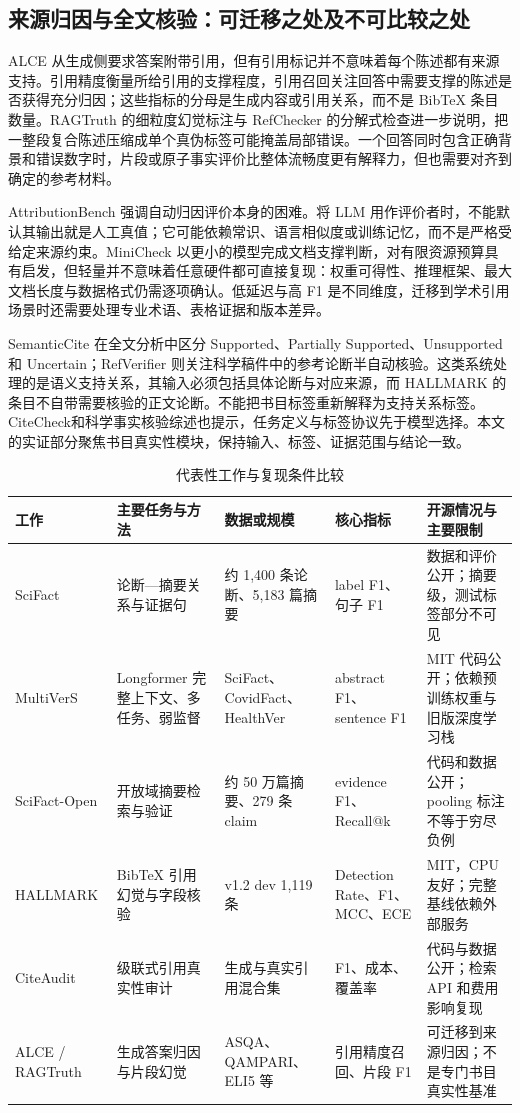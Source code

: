 \documentclass[UTF8,a4paper,11pt]{ctexart}
\begin{document}
\subsection{来源归因与全文核验：可迁移之处及不可比较之处}

ALCE 从生成侧要求答案附带引用\cite{alce}，但有引用标记并不意味着每个陈述都有来源支持。引用精度衡量所给引用的支撑程度，引用召回关注回答中需要支撑的陈述是否获得充分归因；这些指标的分母是生成内容或引用关系，而不是 BibTeX 条目数量。RAGTruth 的细粒度幻觉标注\cite{ragtruth}与 RefChecker 的分解式检查\cite{refchecker}进一步说明，把一整段复合陈述压缩成单个真伪标签可能掩盖局部错误。一个回答同时包含正确背景和错误数字时，片段或原子事实评价比整体流畅度更有解释力，但也需要对齐到确定的参考材料。

AttributionBench 强调自动归因评价本身的困难\cite{attributionbench}。将 LLM 用作评价者时，不能默认其输出就是人工真值；它可能依赖常识、语言相似度或训练记忆，而不是严格受给定来源约束。MiniCheck 以更小的模型完成文档支撑判断\cite{minicheck}，对有限资源预算具有启发，但轻量并不意味着任意硬件都可直接复现：权重可得性、推理框架、最大文档长度与数据格式仍需逐项确认。低延迟与高 F1 是不同维度，迁移到学术引用场景时还需要处理专业术语、表格证据和版本差异。

SemanticCite 在全文分析中区分 Supported、Partially Supported、Unsupported 和 Uncertain\cite{semanticcite}；RefVerifier 则关注科学稿件中的参考论断半自动核验\cite{refverifier}。这类系统处理的是语义支持关系，其输入必须包括具体论断与对应来源，而 HALLMARK 的条目不自带需要核验的正文论断。不能把书目标签重新解释为支持关系标签。CiteCheck\cite{citecheck}和科学事实核验综述\cite{survey}也提示，任务定义与标签协议先于模型选择。本文的实证部分聚焦书目真实性模块，保持输入、标签、证据范围与结论一致。

\begin{table}[H]
\centering
\caption{代表性工作与复现条件比较}
\small
\begin{tabularx}{\textwidth}{p{2.3cm}p{3.2cm}p{2.6cm}p{2.4cm}Y}
\toprule
工作 & 主要任务与方法 & 数据或规模 & 核心指标 & 开源情况与主要限制\\
\midrule
SciFact & 论断—摘要关系与证据句 & 约 1,400 条论断、5,183 篇摘要 & label F1、句子 F1 & 数据和评价公开；摘要级，测试标签部分不可见\\
MultiVerS & Longformer 完整上下文、多任务、弱监督 & SciFact、CovidFact、HealthVer & abstract F1、sentence F1 & MIT 代码公开；依赖预训练权重与旧版深度学习栈\\
SciFact-Open & 开放域摘要检索与验证 & 约 50 万篇摘要、279 条 claim & evidence F1、Recall@k & 代码和数据公开；pooling 标注不等于穷尽负例\\
HALLMARK & BibTeX 引用幻觉与字段核验 & v1.2 dev 1,119 条 & Detection Rate、F1、MCC、ECE & MIT，CPU 友好；完整基线依赖外部服务\\
CiteAudit & 级联式引用真实性审计 & 生成与真实引用混合集 & F1、成本、覆盖率 & 代码与数据公开；检索 API 和费用影响复现\\
ALCE / RAGTruth & 生成答案归因与片段幻觉 & ASQA、QAMPARI、ELI5 等 & 引用精度召回、片段 F1 & 可迁移到来源归因；不是专门书目真实性基准\\
\bottomrule
\end{tabularx}
\end{table}
\end{document}
